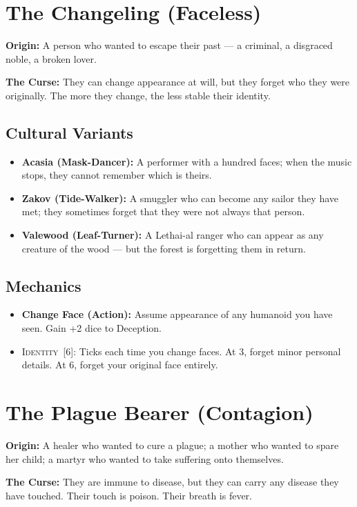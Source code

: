 \documentclass[10pt,twoside]{book}
\newcommand{\timer}[2]{\textsc{#1}~[#2]}
\begin{document}
\section{The Changeling (Faceless)}

\textbf{Origin:} A person who wanted to escape their past --- a criminal, a disgraced noble, a broken lover.

\textbf{The Curse:} They can change appearance at will, but they forget who they were originally. The more they change, the less stable their identity.

\subsection*{Cultural Variants}
\begin{itemize}
\item \textbf{Acasia (Mask-Dancer):} A performer with a hundred faces; when the music stops, they cannot remember which is theirs.
\item \textbf{Zakov (Tide-Walker):} A smuggler who can become any sailor they have met; they sometimes forget that they were not always that person.
\item \textbf{Valewood (Leaf-Turner):} A Lethai-al ranger who can appear as any creature of the wood --- but the forest is forgetting them in return.
\end{itemize}

\subsection*{Mechanics}
\begin{itemize}
\item \textbf{Change Face (Action):} Assume appearance of any humanoid you have seen. Gain +2 dice to Deception.
\item \timer{Identity}{6}: Ticks each time you change faces. At 3, forget minor personal details. At 6, forget your original face entirely.
\end{itemize}

\section{The Plague Bearer (Contagion)}

\textbf{Origin:} A healer who wanted to cure a plague; a mother who wanted to spare her child; a martyr who wanted to take suffering onto themselves.

\textbf{The Curse:} They are immune to disease, but they can carry any disease they have touched. Their touch is poison. Their breath is fever.
\end{document}
